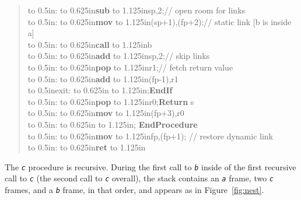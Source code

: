 \documentclass[12pt,english]{book}
\newcommand*{\asmline}[3][]{%
\null\hbox to 0.5in{\ifx#1\empty\else{#1}:\fi\hss}%
\hbox to 0.625in{\textbf{#2}\hss}%
\hbox to 1.125in{#3\hss}}
\begin{document}
\begin{quote}
\asmline{sub}{sp,2};\qquad\qquad // open room for links\\
\asmline{mov}{(sp+1),(fp+2)};\qquad\qquad // static link [b is inside a]\\
\asmline{call}{b}\\
\asmline{add}{sp,2};\qquad\qquad // skip links\\
\asmline{pop}{r1};\qquad\qquad // fetch return value\\
\asmline{add}{(fp-1),r1}\\
\asmline[exit]{}{};\qquad\textbf{EndIf}\\
\asmline{pop}{r0};\qquad\textbf{Return} s\\
\asmline{mov}{(fp+3),r0}\\
\asmline{}{}; \textbf{EndProcedure}\\
\asmline{mov}{fp,(fp+1)}; // restore dynamic link\\
\asmline{ret}{}
\end{quote}

\clearpage
The \texttt{\textit{c}} procedure is recursive.
During the first call to \texttt{\textit{b}}
inside of the first recursive call to \texttt{\textit{c}}
(the second call to \texttt{\textit{c}} overall),
the stack contains an \texttt{\textit{a}} frame,
two \texttt{\textit{c}} frames, and a \texttt{\textit{b}} frame,
in that order, and appears as in Figure~\ref{fig:nest}.
\end{document}
